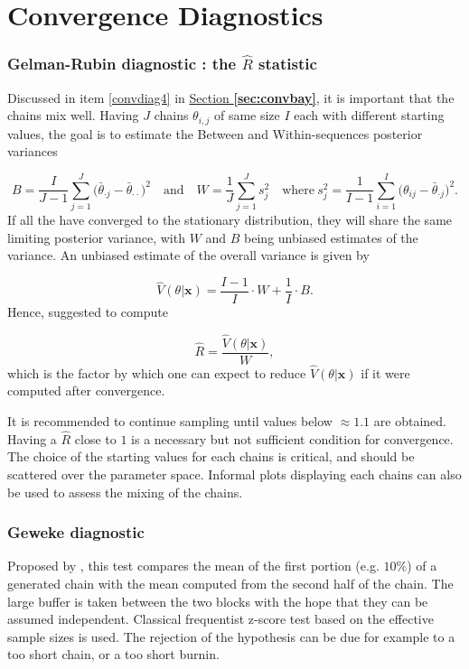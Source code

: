 \section{Convergence Diagnostics}\label{app:convdiag}


\subsubsection*{Gelman-Rubin diagnostic : the $\hat{R}$ statistic}

Discussed in item \ref{convdiag4} in \hyperref[sec:convbay]{Section \textbf{\ref{sec:convbay}}}, it is important that the chains mix well. Having $J$ chains $\theta_{i,j}$ of same size $I$ each with different starting values, the goal is to estimate the Between and Within-sequences posterior variances

\begin{equation*}
B= \frac{I}{J-1}\sum_{j=1}^J\big(\bar{\theta}_{\cdot j} - \bar{\theta}_{\cdot \cdot}\big)^2 \quad \text{and}\quad W=\frac{1}{J}\sum_{j=1}^Js^2_j \quad \text{where} \ s^2_j=\frac{1}{I-1}\sum_{i=1}^I\big(\theta_{ij}-\bar{\theta}_{\cdot j}\big)^2.
\end{equation*}
If all the have converged to the stationary distribution, they will share the same limiting posterior variance, with $W$ and $B$ being unbiased estimates of the variance. An unbiased estimate of the overall variance is given by 

\begin{equation}
\hat{V}(\theta|\boldsymbol{x})=\frac{I-1}{I}\cdot W+ \frac{1}{I}\cdot B.
\end{equation}
Hence, \citet{gelman1992} suggested to compute 

\begin{equation}
\hat{R}=\frac{\hat{V}(\theta|\boldsymbol{x})}{W},
\end{equation}
which is the factor by which one can expect to reduce $\hat{V}(\theta|\boldsymbol{x})$ if it were computed after convergence. 

It is recommended to continue sampling until values below $\approx 1.1$ are obtained. Having a $\hat{R}$ close to $1$ is a necessary but not sufficient condition for convergence. The choice of the starting values for each chains is critical, and should be scattered over the parameter space. Informal plots displaying each chains can also be used to assess the mixing of the chains.


\subsubsection*{Geweke diagnostic}
Proposed by \citet{Geweke92}, this test compares the mean of the first portion (e.g. $10\%$) of a generated chain with the mean computed from the second half of the chain. The large buffer is taken between the two blocks with the hope that they can be assumed independent. Classical frequentist z-score test based on the effective sample sizes is used. 
The rejection of the hypothesis can be due for example to a too short chain, or a too short burnin.

